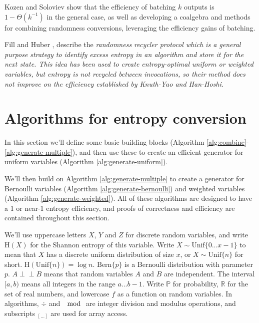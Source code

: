 \documentclass[lettersize,journal]{IEEEtran}
\newcommand{\indep}{\perp\!\!\!\perp}
\newcommand{\unif}[1]{\mathrm{Unif}\{#1\}}
\newcommand{\bern}[1]{\mathrm{Bern}\{#1\}}
\newcommand{\Entropy}{\mathrm{H}}
\newcommand{\entropy}[1]{\Entropy(#1)}
\begin{document}
Kozen and Soloviev \cite{kozen2022} show that the efficiency of batching $k$ outputs is $1 - \Theta(k^{-1})$ in the general case, as well as developing a coalgebra and methods for combining randomness conversions, leveraging the efficiency gains of batching.

Fill and Huber \cite{fill2000randomness, huber2016perfect}, describe the \em randomness recycler \em protocol which is a general purpose strategy to identify excess entropy in an algorithm and store it for the next state. This idea has been used to create entropy-optimal uniform \cite{lumbroso2013optimal, huber2024optimalrollingfairdice} or weighted \cite{huber2024optimalrollingfairdice} variables, but entropy is not recycled between invocations, so their method does not improve on the efficiency established by Knuth-Yao and Han-Hoshi.


\section{Algorithms for entropy conversion}

In this section we'll define some basic building blocks (Algorithm \ref{alg:combine}-\ref{alg:generate-multiple}), and then use these to create an efficient generator for uniform variables (Algorithm \ref{alg:generate-uniform}).

We'll then build on Algorithm \ref{alg:generate-multiple} to create a generator for Bernoulli variables (Algorithm \ref{alg:generate-bernoulli}) and weighted variables (Algorithm \ref{alg:generate-weighted}). All of these algorithms are designed to have a 1 or near-1 entropy efficiency, and proofs of correctness and efficiency are contained throughout this section.

We'll use uppercase letters $X$, $Y$ and $Z$ for discrete random variables, and write $\entropy{X}$ for the Shannon entropy of this variable. Write $X \sim \unif{0 ... x-1}$ to mean that $X$ has a discrete uniform distribution of size $x$, or $X \sim \unif{n}$ for short. $\entropy{\unif{n}} = \log n$. $\bern{p}$ is a Bernoulli distribution with parameter $p$. $A \indep B$ means that random variables $A$ and $B$ are independent.  The interval $[a,b)$ means all integers in the range $a...b-1$. Write $\mathbb{P}$ for probability, $\mathbb{R}$ for the set of real numbers, and lowercase $f$ as a function on random variables. In algorithms, $\div$ and $\mod$ are integer division and modulus operations, and subscripts $_{[...]}$ are used for array access.
\end{document}
